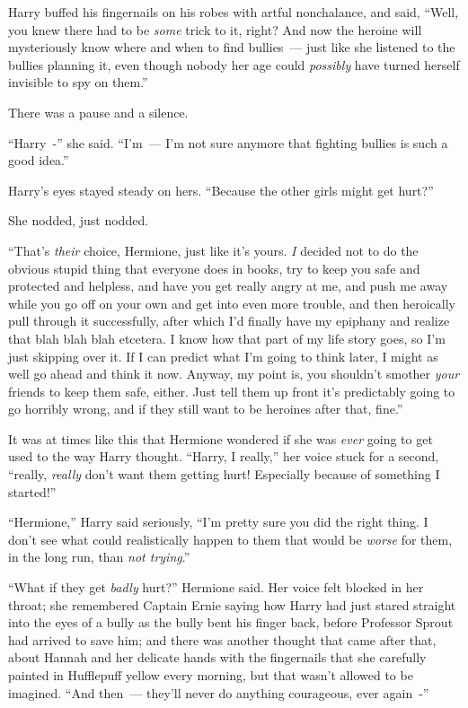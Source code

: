 Harry buffed his fingernails on his robes with artful nonchalance, and said, ``Well, you knew there had to be \emph{some} trick to it, right? And now the heroine will mysteriously know where and when to find bullies~--- just like she listened to the bullies planning it, even though nobody her age could \emph{possibly} have turned herself invisible to spy on them.''

There was a pause and a silence.

``Harry~-'' she said. ``I'm~--- I'm not sure anymore that fighting bullies is such a good idea.''

Harry's eyes stayed steady on hers. ``Because the other girls might get hurt?''

She nodded, just nodded.

``That's \emph{their} choice, Hermione, just like it's yours. \emph{I} decided not to do the obvious stupid thing that everyone does in books, try to keep you safe and protected and helpless, and have you get really angry at me, and push me away while you go off on your own and get into even more trouble, and then heroically pull through it successfully, after which I'd finally have my epiphany and realize that blah blah blah etcetera. I know how that part of my life story goes, so I'm just skipping over it. If I can predict what I'm going to think later, I might as well go ahead and think it now. Anyway, my point is, you shouldn't smother \emph{your} friends to keep them safe, either. Just tell them up front it's predictably going to go horribly wrong, and if they still want to be heroines after that, fine.''

It was at times like this that Hermione wondered if she was \emph{ever} going to get used to the way Harry thought. ``Harry, I really,'' her voice stuck for a second, ``really, \emph{really} don't want them getting hurt! Especially because of something I started!''

``Hermione,'' Harry said seriously, ``I'm pretty sure you did the right thing. I don't see what could realistically happen to them that would be \emph{worse} for them, in the long run, than \emph{not trying}.''

``What if they get \emph{badly} hurt?'' Hermione said. Her voice felt blocked in her throat; she remembered Captain Ernie saying how Harry had just stared straight into the eyes of a bully as the bully bent his finger back, before Professor Sprout had arrived to save him; and there was another thought that came after that, about Hannah and her delicate hands with the fingernails that she carefully painted in Hufflepuff yellow every morning, but that wasn't allowed to be imagined. ``And then~--- they'll never do anything courageous, ever again~-''

